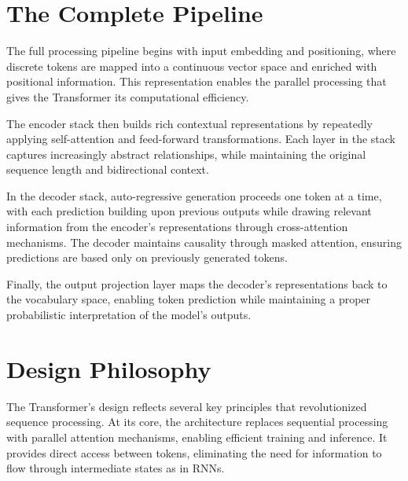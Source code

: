 \section{The Complete Pipeline}
\noindent
The full processing pipeline begins with input embedding and positioning, where discrete tokens are mapped into a continuous vector space and enriched with positional information. This representation enables the parallel processing that gives the Transformer its computational efficiency.

The encoder stack then builds rich contextual representations by repeatedly applying self-attention and feed-forward transformations. Each layer in the stack captures increasingly abstract relationships, while maintaining the original sequence length and bidirectional context.

In the decoder stack, auto-regressive generation proceeds one token at a time, with each prediction building upon previous outputs while drawing relevant information from the encoder's representations through cross-attention mechanisms. The decoder maintains causality through masked attention, ensuring predictions are based only on previously generated tokens.

Finally, the output projection layer maps the decoder's representations back to the vocabulary space, enabling token prediction while maintaining a proper probabilistic interpretation of the model's outputs.

\section{Design Philosophy}
\noindent
The Transformer's design reflects several key principles that revolutionized sequence processing. At its core, the architecture replaces sequential processing with parallel attention mechanisms, enabling efficient training and inference. It provides direct access between tokens, eliminating the need for information to flow through intermediate states as in RNNs.


